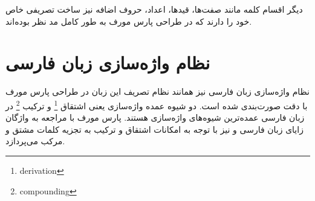 \documentclass[12pt,onecolumn,a4paper]{article}
\begin{document}
    \par
    دیگر اقسام کلمه مانند صفت‌ها، قیدها، اعداد، حروف اضافه نیز ساخت تصریفی خاص خود را دارند که در طراحی پارس مورف به طور کامل مد نظر بوده‌اند.

    \section{نظام واژه‌سازی زبان فارسی}
    نظام واژه‌سازی زبان فارسی نیز همانند نظام تصریف این زبان در طراحی پارس مورف با دقت صورت‌بندی شده است. دو شیوه عمده واژه‌سازی یعنی اشتقاق \footnote{derivation} و ترکیب \footnote{compounding} در زبان فارسی عمده‌ترین شیوه‌های واژه‌سازی هستند. پارس مورف با مراجعه به واژگان زایای زبان فارسی {\mfo\citep{Eslami83}} و نیز با توجه به امکانات اشتقاق و ترکیب به تجزیه کلمات مشتق و مرکب می‌پردازد.
\end{document}
